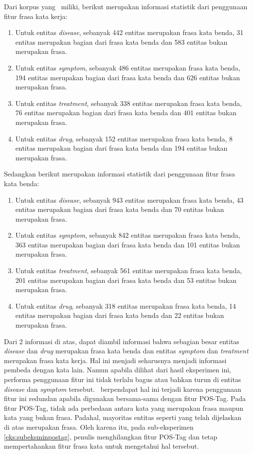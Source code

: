 	Dari korpus yang \saya~miliki, berikut merupakan informasi statistik dari penggunaan fitur frasa kata kerja:
	\begin{enumerate}
		\item Untuk entitas \textit{disease}, sebanyak 442 entitas merupakan frasa kata benda, 31 entitas merupakan bagian dari frasa kata benda dan 583 entitas bukan merupakan frasa.
		\item Untuk entitas \textit{symptom}, sebanyak 486 entitas merupakan frasa kata benda, 194 entitas merupakan bagian dari frasa kata benda dan 626 entitas bukan merupakan frasa.
		\item Untuk entitas \textit{treatment}, sebanyak 338 entitas merupakan frasa kata benda, 76 entitas merupakan bagian dari frasa kata benda dan 401 entitas bukan merupakan frasa.
		\item Untuk entitas \textit{drug}, sebanyak 152 entitas merupakan frasa kata benda, 8 entitas merupakan bagian dari frasa kata benda dan 194 entitas bukan merupakan frasa.
	\end{enumerate}

	Sedangkan berikut merupakan informasi statistik dari penggunaan fitur frasa kata benda:
	\begin{enumerate}
		\item Untuk entitas \textit{disease}, sebanyak 943 entitas merupakan frasa kata benda, 43 entitas merupakan bagian dari frasa kata benda dan 70 entitas bukan merupakan frasa.
		\item Untuk entitas \textit{symptom}, sebanyak 842 entitas merupakan frasa kata benda, 363 entitas merupakan bagian dari frasa kata benda dan 101 entitas bukan merupakan frasa.
		\item Untuk entitas \textit{treatment}, sebanyak 561 entitas merupakan frasa kata benda, 201 entitas merupakan bagian dari frasa kata benda dan 53 entitas bukan merupakan frasa.
		\item Untuk entitas \textit{drug}, sebanyak 318 entitas merupakan frasa kata benda, 14 entitas merupakan bagian dari frasa kata benda dan 22  entitas bukan merupakan frasa.
	\end{enumerate}
	
	Dari 2 informasi di atas, dapat diambil informasi bahwa sebagian besar entitas \textit{disease} dan \textit{drug} merupakan frasa kata benda dan entitas \textit{symptom} dan \textit{treatment} merupakan frasa kata kerja. Hal ini menjadi seharusnya menjadi informasi pembeda dengan kata lain. Namun apabila dilihat dari hasil eksperimen ini, performa penggunaan fitur ini tidak terlalu bagus atau bahkan turun di entitas \textit{disease} dan \textit{symptom} tersebut. \Saya~berpendapat hal ini terjadi karena penggunaan fitur ini redundan apabila digunakan bersama-sama dengan fitur POS-Tag. Pada fitur POS-Tag, tidak ada perbedaan antara kata yang merupakan frasa maupun kata yang bukan frasa. Padahal, mayoritas entitas seperti yang telah dijelaskan di atas merupakan frasa. Oleh karena itu, pada sub-eksperimen \ref{eks:subeksminpostag}, penulis menghilangkan fitur POS-Tag dan tetap mempertahankan fitur frasa kata untuk mengetahui hal tersebut. 
	
